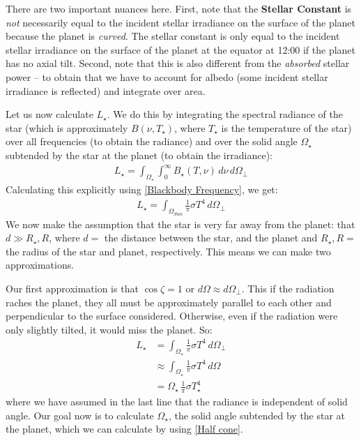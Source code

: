 There are two important nuances here. First, note that the \textbf{Stellar Constant} is \textit{not} necessarily equal to the incident stellar irradiance on the surface of the planet because the planet is \textit{curved}. The stellar constant is only equal to the incident stellar irradiance on the surface of the planet at the equator at 12:00 if the planet has no axial tilt. Second, note that this is also different from the \textit{absorbed} stellar power – to obtain that we have to account for albedo (some incident stellar irradiance is reflected) and integrate over area. 

Let us now calculate $L_{\star}$. We do this by integrating the spectral radiance of the star (which is approximately $B(\nu,T_{\star})$, where $T_{\star}$ is the temperature of the star) over all frequencies (to obtain the radiance) and over the solid angle $\Omega_\star$ subtended by the star at the planet (to obtain the irradiance):
\begin{align*}
    L_{\star}=\int_{\Omega_{\star}}\int _0^\infty B_{\star}(T,\nu)\,d\nu\,d\Omega_\perp
\end{align*}
Calculating this explicitly using \ref{Blackbody Frequency}, we get:
\begin{align*}
    L_{\star}=\int_{\Omega_{Sun}} \frac{1}{\pi}\sigma T^4 \, d\Omega_\perp
\end{align*}
We now make the assumption that the star is very far away from the planet: that $d \gg R_{\star}, R$, where $d=$ the distance between the star, and the planet and $R_\star, R=$ the radius of the star and planet, respectively. This means we can make two approximations.

Our first approximation is that $\cos\zeta=1$ or $d\Omega\approx d\Omega_\perp$. This if the radiation raches the planet, they all must be approximately parallel to each other and perpendicular to the surface considered. Otherwise, even if the radiation were only slightly tilted, it would miss the planet. So:
\begin{align*}
    L_\star &=\int_{\Omega_{\star}} \frac{1}{\pi}\sigma T^4 \, d\Omega_\perp\\
    &\approx\int_{\Omega_{\star}} \frac{1}{\pi}\sigma T^4 \, d\Omega\\
    &=\Omega_{\star}\,\frac{1}{\pi}\sigma T_{\star}^4
\end{align*}
where we have assumed in the last line that the radiance is independent of solid angle. Our goal now is to calculate $\Omega_{\star}$, the solid angle subtended by the star at the planet, which we can calculate by using \ref{Half cone}.


